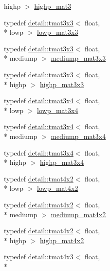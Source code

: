 \begin{DoxyCompactItemize}
highp $>$ \hyperlink{group__core__precision_ga334034520a655db41a2e188951f6aaad}{highp\-\_\-mat3}
\item 
typedef \hyperlink{structglm_1_1detail_1_1tmat3x3}{detail\-::tmat3x3}$<$ float, \\*
lowp $>$ \hyperlink{group__core__precision_ga31688b397d10806ead332c3adb7dc0f0}{lowp\-\_\-mat3x3}
\item 
typedef \hyperlink{structglm_1_1detail_1_1tmat3x3}{detail\-::tmat3x3}$<$ float, \\*
mediump $>$ \hyperlink{group__core__precision_gae4c7f0d5d3dab712f9a671183e63e5ab}{mediump\-\_\-mat3x3}
\item 
typedef \hyperlink{structglm_1_1detail_1_1tmat3x3}{detail\-::tmat3x3}$<$ float, \\*
highp $>$ \hyperlink{group__core__precision_ga8a3703cc71cdfc8928eddf46b3763c4b}{highp\-\_\-mat3x3}
\item 
typedef \hyperlink{structglm_1_1detail_1_1tmat3x4}{detail\-::tmat3x4}$<$ float, \\*
lowp $>$ \hyperlink{group__core__precision_ga9cea06e7378fe59abf95c1f56edc4320}{lowp\-\_\-mat3x4}
\item 
typedef \hyperlink{structglm_1_1detail_1_1tmat3x4}{detail\-::tmat3x4}$<$ float, \\*
mediump $>$ \hyperlink{group__core__precision_ga5654236019c6a732844da31534a3cf28}{mediump\-\_\-mat3x4}
\item 
typedef \hyperlink{structglm_1_1detail_1_1tmat3x4}{detail\-::tmat3x4}$<$ float, \\*
highp $>$ \hyperlink{group__core__precision_gabaf9c8dd35db715b1093042703f879d0}{highp\-\_\-mat3x4}
\item 
typedef \hyperlink{structglm_1_1detail_1_1tmat4x2}{detail\-::tmat4x2}$<$ float, \\*
lowp $>$ \hyperlink{group__core__precision_ga2cfe24ae14da17f3510acfc3d03e05a5}{lowp\-\_\-mat4x2}
\item 
typedef \hyperlink{structglm_1_1detail_1_1tmat4x2}{detail\-::tmat4x2}$<$ float, \\*
mediump $>$ \hyperlink{group__core__precision_ga5ade2a6a65653683f76988c45da39f15}{mediump\-\_\-mat4x2}
\item 
typedef \hyperlink{structglm_1_1detail_1_1tmat4x2}{detail\-::tmat4x2}$<$ float, \\*
highp $>$ \hyperlink{group__core__precision_gadf9c4a7947c2b0a79f52cc86a860f270}{highp\-\_\-mat4x2}
\item 
typedef \hyperlink{structglm_1_1detail_1_1tmat4x3}{detail\-::tmat4x3}$<$ float, \\*

\end{DoxyCompactItemize}
